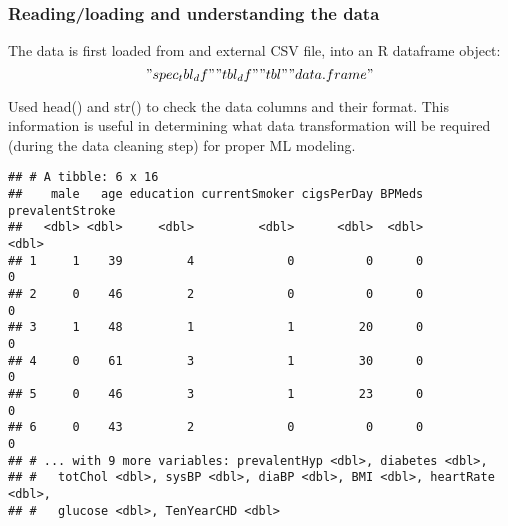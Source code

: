 \documentclass[]{article}
\begin{document}
\subsubsection{Reading/loading and understanding the
data}\label{readingloading-and-understanding-the-data}

The data is first loaded from and external CSV file, into an R dataframe
object: \["spec_tbl_df" "tbl_df" "tbl" "data.frame"\]

Used head() and str() to check the data columns and their format. This
information is useful in determining what data transformation will be
required (during the data cleaning step) for proper ML modeling.

\begin{verbatim}
## # A tibble: 6 x 16
##    male   age education currentSmoker cigsPerDay BPMeds prevalentStroke
##   <dbl> <dbl>     <dbl>         <dbl>      <dbl>  <dbl>           <dbl>
## 1     1    39         4             0          0      0               0
## 2     0    46         2             0          0      0               0
## 3     1    48         1             1         20      0               0
## 4     0    61         3             1         30      0               0
## 5     0    46         3             1         23      0               0
## 6     0    43         2             0          0      0               0
## # ... with 9 more variables: prevalentHyp <dbl>, diabetes <dbl>,
## #   totChol <dbl>, sysBP <dbl>, diaBP <dbl>, BMI <dbl>, heartRate <dbl>,
## #   glucose <dbl>, TenYearCHD <dbl>
\end{verbatim}
\end{document}
